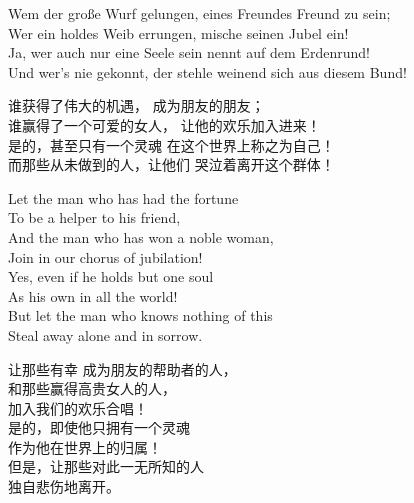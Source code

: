 \begin{paracol}{4}
\begin{Gverse}
Wem der gro{\ss}e Wurf gelungen,
eines Freundes Freund zu sein;\\
Wer ein holdes Weib errungen,
mische seinen Jubel ein!\\
Ja, wer auch nur eine Seele 
sein nennt auf dem Erdenrund!\\
Und wer's nie gekonnt, der stehle 
weinend sich aus diesem Bund! 
\end{Gverse}
\begin{CGverse}
谁获得了伟大的机遇，
成为朋友的朋友；\\
谁赢得了一个可爱的女人，
让他的欢乐加入进来！\\
是的，甚至只有一个灵魂
在这个世界上称之为自己！\\
而那些从未做到的人，让他们
哭泣着离开这个群体！
\end{CGverse}
\begin{Everse}
Let the man who has had the fortune\\
To be a helper to his friend,\\
And the man who has won a noble woman,\\
Join in our chorus of jubilation!\\
Yes, even if he holds but one soul\\
As his own in all the world!\\
But let the man who knows nothing of this\\
Steal away alone and in sorrow.
\end{Everse}
\begin{CEverse}
让那些有幸
成为朋友的帮助者的人，\\
和那些赢得高贵女人的人，\\
加入我们的欢乐合唱！\\
是的，即使他只拥有一个灵魂\\
作为他在世界上的归属！\\
但是，让那些对此一无所知的人\\
独自悲伤地离开。
\end{CEverse}


\end{paracol}
